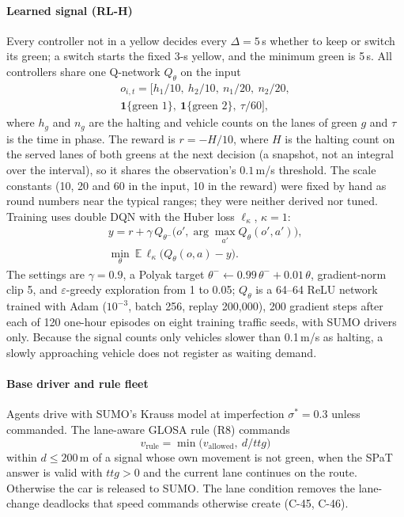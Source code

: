 \paragraph{Learned signal (RL-H)} Every controller not in a yellow decides every $\Delta=5$\,s whether to keep or switch its green; a
switch starts the fixed 3-s yellow, and the minimum green is 5\,s. All controllers share one Q-network $Q_\theta$ on the input
\begin{multline}
o_{i,t}=\big[h_1/10,\ h_2/10,\ n_1/20,\ n_2/20,\\ \mathbf{1}\{\text{green }1\},\ \mathbf{1}\{\text{green }2\},\ \tau/60\big],
\end{multline}
where $h_g$ and $n_g$ are the halting and vehicle counts on the lanes of green $g$ and $\tau$ is the time in phase. The reward is
$r=-H/10$, where $H$ is the halting count on the served lanes of both greens at the next decision (a snapshot, not an integral over the
interval), so it shares the observation's $0.1$\,m/s threshold. The scale constants (10, 20 and 60 in the input, 10 in the reward) were
fixed by hand as round numbers near the typical ranges; they were neither derived nor tuned. Training uses double DQN with the Huber loss
$\ell_\kappa$, $\kappa=1$:
\begin{gather}
y=r+\gamma\,Q_{\theta^-}\!\big(o',\arg\max_{a'}Q_\theta(o',a')\big),\\
\min_\theta\ \mathbb E\,\ell_\kappa\big(Q_\theta(o,a)-y\big).
\end{gather}
The settings are $\gamma=0.9$, a Polyak target $\theta^-\leftarrow0.99\,\theta^-+0.01\,\theta$, gradient-norm clip 5, and $\varepsilon$-greedy
exploration from 1 to 0.05; $Q_\theta$ is a 64--64 ReLU network trained with Adam ($10^{-3}$, batch 256, replay 200{,}000), 200 gradient
steps after each of 120 one-hour episodes on eight training traffic seeds, with SUMO drivers only. Because the signal counts only vehicles slower than 0.1\,m/s as halting, a slowly approaching vehicle does not
register as waiting demand.
\paragraph{Base driver and rule fleet} Agents drive with SUMO's Krauss model at imperfection $\sigma^*=0.3$ unless commanded. The
lane-aware GLOSA rule (R8) commands
\begin{equation}
v_{\mathrm{rule}}=\min\big(v_{\mathrm{allowed}},\ d/\mathit{ttg}\big)
\end{equation}
within $d\le200$\,m of a signal whose own movement is not green, when the SPaT answer is valid with $\mathit{ttg}>0$ and the current lane
continues on the route. Otherwise the car is released to SUMO. The lane condition removes the lane-change deadlocks that speed commands
otherwise create (C-45, C-46).
